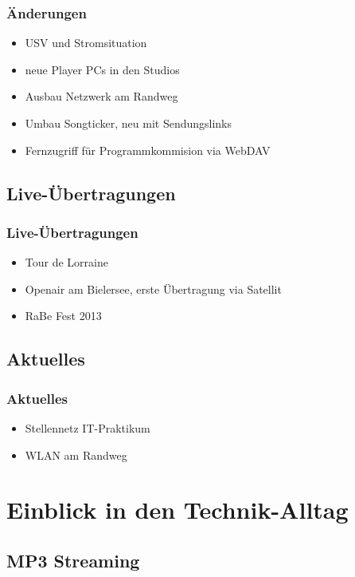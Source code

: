 \documentclass{beamer}
\begin{document}
  \frame
  {
    \frametitle{\"Anderungen}

    \begin{itemize}
    \item{USV und Stromsituation}
    \item{neue Player PCs in den Studios}
    \item{Ausbau Netzwerk am Randweg}
    \item{Umbau Songticker, neu mit Sendungslinks}
    \item{Fernzugriff f\"ur Programmkommision via WebDAV}
    \end{itemize}
  }

  \subsection*{Live-\"Ubertragungen}

  \frame
  {
  }

  \frame
  {
    \frametitle{Live-\"Ubertragungen}

    \begin{itemize}
    \item{Tour de Lorraine}
    \item{Openair am Bielersee, erste \"Ubertragung via Satellit}
    \item{RaBe Fest 2013}
    \end{itemize}
  }

  \subsection*{Aktuelles}

  \frame
  {
  }

  \frame
  {
    \frametitle{Aktuelles}
    
    \begin{itemize}
    \item{Stellennetz IT-Praktikum}
    \item{WLAN am Randweg}
    \end{itemize}
  }

  \section*{Einblick in den Technik-Alltag}

  \subsection*{MP3 Streaming}
\end{document}
